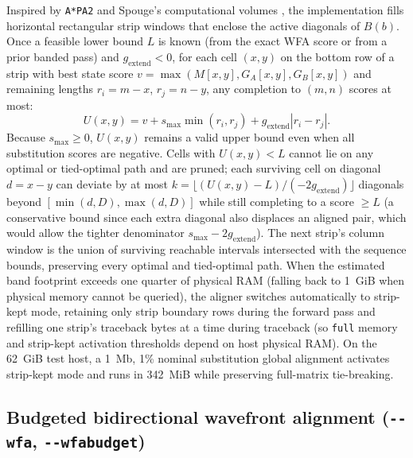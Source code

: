 \documentclass[11pt,a4paper]{article}
\begin{document}
Inspired by \texttt{A*PA2} \citep{grootkoerkamp2024apa2} and Spouge's computational volumes \citep{spouge1989speeding}, the implementation fills horizontal rectangular strip windows that enclose the active diagonals of $B(b)$. Once a feasible lower bound $L$ is known (from the exact WFA score or from a prior banded pass) and $g_{\text{extend}} < 0$, for each cell $(x, y)$ on the bottom row of a strip with best state score $v = \max(M[x,y], G_A[x,y], G_B[x,y])$ and remaining lengths $r_i = m - x$, $r_j = n - y$, any completion to $(m, n)$ scores at most:
\begin{equation}
  U(x, y) = v + s_{\max}\min(r_i, r_j) + g_{\text{extend}}|r_i - r_j|.
\end{equation}
Because $s_{\max} \ge 0$, $U(x, y)$ remains a valid upper bound even when all substitution scores are negative. Cells with $U(x, y) < L$ cannot lie on any optimal or tied-optimal path and are pruned; each surviving cell on diagonal $d = x - y$ can deviate by at most $k = \lfloor (U(x, y) - L) / (-2 g_{\text{extend}}) \rfloor$ diagonals beyond $[\min(d, D), \max(d, D)]$ while still completing to a score $\ge L$ (a conservative bound since each extra diagonal also displaces an aligned pair, which would allow the tighter denominator $s_{\max} - 2 g_{\text{extend}}$). The next strip's column window is the union of surviving reachable intervals intersected with the sequence bounds, preserving every optimal and tied-optimal path. When the estimated band footprint exceeds one quarter of physical RAM (falling back to 1~GiB when physical memory cannot be queried), the aligner switches automatically to strip-kept mode, retaining only strip boundary rows during the forward pass and refilling one strip's traceback bytes at a time during traceback (so \texttt{full} memory and strip-kept activation thresholds depend on host physical RAM). On the 62~GiB test host, a 1~Mb, 1\% nominal substitution global alignment activates strip-kept mode and runs in 342~MiB while preserving full-matrix tie-breaking.

\subsection{Budgeted bidirectional wavefront alignment (\texttt{-{}-wfa}, \texttt{-{}-wfabudget})}
\label{sec:wfa}
\end{document}
